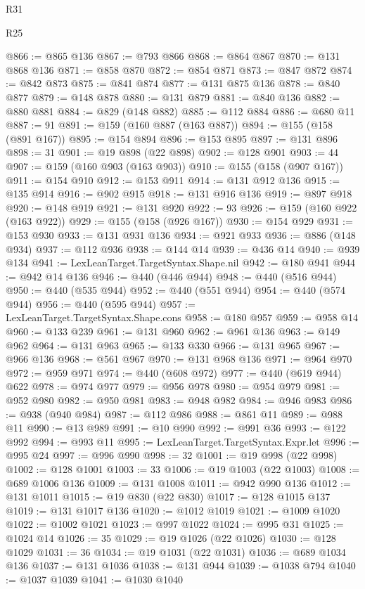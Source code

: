 \begin{lexlean}{R31}
\begin{lexlean}{R25}
\begin{coremodule}
{{{{{{{{{{{{{{{{{{{{{{{{{{{{{{{{{{{{{{{{{{{{{{{{{{{{{{{{{{{{{{{{{{{{{{{{{{{{{{{{{{{{{{{{{{{{{{{{{{{{{{{{{{{{{{{{{{{{{{{{{{{{{{{{{{{{{{{{{{{{{{{{{{{{{{{{{{{{{{{{{{{{{{{{{{{{{{{{{{{{{{{{{{{{{{{{{{{{{{{@866 := @865 @136
@867 := @793 @866
@868 := @864 @867
@870 := @131 @868 @136
@871 := @858 @870
@872 := @854 @871
@873 := @847 @872
@874 := @842 @873
@875 := @841 @874
@877 := @131 @875 @136
@878 := @840 @877
@879 := @148 @878
@880 := @131 @879
@881 := @840 @136
@882 := @880 @881
@884 := @829 (@148 @882)
@885 := @112 @884
@886 := @680 @11
@887 := 91
@891 := @159 (@160 @887 (@163 @887))
@894 := @155 (@158 (@891 @167))
@895 := @154 @894
@896 := @153 @895
@897 := @131 @896
@898 := 31
@901 := @19 @898 (@22 @898)
@902 := @128 @901
@903 := 44
@907 := @159 (@160 @903 (@163 @903))
@910 := @155 (@158 (@907 @167))
@911 := @154 @910
@912 := @153 @911
@914 := @131 @912 @136
@915 := @135 @914
@916 := @902 @915
@918 := @131 @916 @136
@919 := @897 @918
@920 := @148 @919
@921 := @131 @920
@922 := 93
@926 := @159 (@160 @922 (@163 @922))
@929 := @155 (@158 (@926 @167))
@930 := @154 @929
@931 := @153 @930
@933 := @131 @931 @136
@934 := @921 @933
@936 := @886 (@148 @934)
@937 := @112 @936
@938 := @144 @14
@939 := @436 @14
@940 := @939 @134
@941 := LexLeanTarget.TargetSyntax.Shape.nil
@942 := @180 @941
@944 := @942 @14 @136
@946 := @440 (@446 @944)
@948 := @440 (@516 @944)
@950 := @440 (@535 @944)
@952 := @440 (@551 @944)
@954 := @440 (@574 @944)
@956 := @440 (@595 @944)
@957 := LexLeanTarget.TargetSyntax.Shape.cons
@958 := @180 @957
@959 := @958 @14
@960 := @133 @239
@961 := @131 @960
@962 := @961 @136
@963 := @149 @962
@964 := @131 @963
@965 := @133 @330
@966 := @131 @965
@967 := @966 @136
@968 := @561 @967
@970 := @131 @968 @136
@971 := @964 @970
@972 := @959 @971
@974 := @440 (@608 @972)
@977 := @440 (@619 @944) @622
@978 := @974 @977
@979 := @956 @978
@980 := @954 @979
@981 := @952 @980
@982 := @950 @981
@983 := @948 @982
@984 := @946 @983
@986 := @938 (@940 @984)
@987 := @112 @986
@988 := @861 @11
@989 := @988 @11
@990 := @13 @989
@991 := @10 @990
@992 := @991 @36
@993 := @122 @992
@994 := @993 @11
@995 := LexLeanTarget.TargetSyntax.Expr.let
@996 := @995 @24
@997 := @996 @990
@998 := 32
@1001 := @19 @998 (@22 @998)
@1002 := @128 @1001
@1003 := 33
@1006 := @19 @1003 (@22 @1003)
@1008 := @689 @1006 @136
@1009 := @131 @1008
@1011 := @942 @990 @136
@1012 := @131 @1011
@1015 := @19 @830 (@22 @830)
@1017 := @128 @1015 @137
@1019 := @131 @1017 @136
@1020 := @1012 @1019
@1021 := @1009 @1020
@1022 := @1002 @1021
@1023 := @997 @1022
@1024 := @995 @31
@1025 := @1024 @14
@1026 := 35
@1029 := @19 @1026 (@22 @1026)
@1030 := @128 @1029
@1031 := 36
@1034 := @19 @1031 (@22 @1031)
@1036 := @689 @1034 @136
@1037 := @131 @1036
@1038 := @131 @944
@1039 := @1038 @794
@1040 := @1037 @1039
@1041 := @1030 @1040
}}}}}}}}}}}}}}}}}}}}}}}}}}}}}}}}}}}}}}}}}}}}}}}}}}}}}}}}}}}}}}}}}}}}}}}}}}}}}}}}}}}}}}}}}}}}}}}}}}}}}}}}}}}}}}}}}}}}}}}}}}}}}}}}}}}}}}}}}}}}}}}}}}}}}}}}}}}}}}}}}}}}}}}}}}}}}}}}}}}}}}}}}}}}}}}}}}}}}}}
\end{coremodule}
\end{lexlean}
\end{lexlean}
